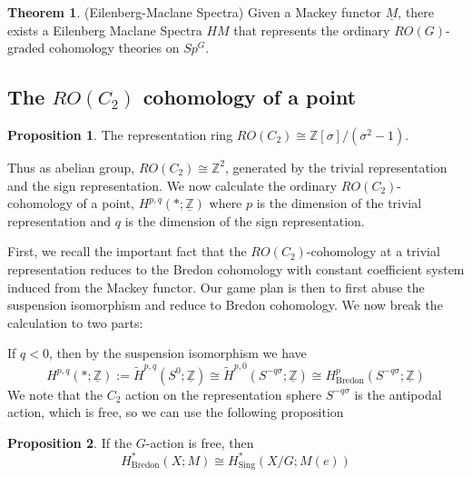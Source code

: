 \documentclass{article}
\theoremstyle{definition}
\newtheorem{theorem}{Theorem}[section]
\theoremstyle{definition}
\theoremstyle{definition}
\theoremstyle{definition}
\newtheorem{proposition}{Proposition}[theorem]
\theoremstyle{definition}
\theoremstyle{definition}
\theoremstyle{definition}
\begin{document}
\begin{tcolorbox}[colback=red!5!white,colframe=red!30!white]
\begin{theorem}
(Eilenberg-Maclane Spectra) Given a Mackey functor $\underline{M}$, there exists a Eilenberg Maclane Spectra $HM$ that represents the ordinary $RO(G)$-graded cohomology theories on $Sp^G$. 
\end{theorem}
\end{tcolorbox}


\subsection{The $RO(C_2)$ cohomology of a point}


\begin{tcolorbox}[colback=blue!5!white,colframe=blue!30!white]
\begin{proposition}
The representation ring $RO(C_2)\cong \mathbb{Z}[\sigma]/(\sigma^2-1)$. 
\end{proposition}
\end{tcolorbox}
Thus as abelian group, $RO(C_2)\cong \mathbb{Z}^2$, generated by the trivial representation and the sign representation. We now calculate the ordinary $RO(C_2)$-cohomology of a point, $H^{p,q}(*;\underline{\mathbb{Z}})$ where $p$ is the dimension of the trivial representation
and $q$ is the dimension of the sign representation. 

First, we recall the important fact that the $RO(C_2)$-cohomology at a trivial representation reduces to the Bredon cohomology with constant coefficient system induced from the Mackey functor. Our game plan is then to first abuse the suspension isomorphism and reduce to Bredon cohomology. We now break the calculation to two parts:

If $q<0$, then by the suspension isomorphism we have $$H^{p,q}(*;\underline{\mathbb{Z}}):= \tilde{H}^{p,q}(S^0;\underline{\mathbb{Z}})\cong \tilde{H}^{p,0}(S^{-q\sigma};\underline{\mathbb{Z}})\cong H^{p}_{\textrm{Bredon}}(S^{-q\sigma};\underline{\mathbb{Z}})$$
We note that the $C_2$ action on the representation sphere $S^{-q\sigma}$ is the antipodal action, which is free, so we can use the following proposition


\begin{tcolorbox}[colback=blue!5!white,colframe=blue!30!white]
\begin{proposition}
If the $G$-action is free, then 
\[H^*_{\textrm{Bredon}}(X; M)\cong H^*_{\textrm{Sing}}(X/G; M(e))\]
\end{proposition}
\end{tcolorbox}
\end{document}
